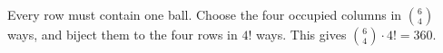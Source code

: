 Every row must contain one ball. Choose the four occupied columns in $\binom64$ ways, and biject them to the four rows in $4!$ ways. This gives $\binom64\cdot4!=\boxed{360}$.
